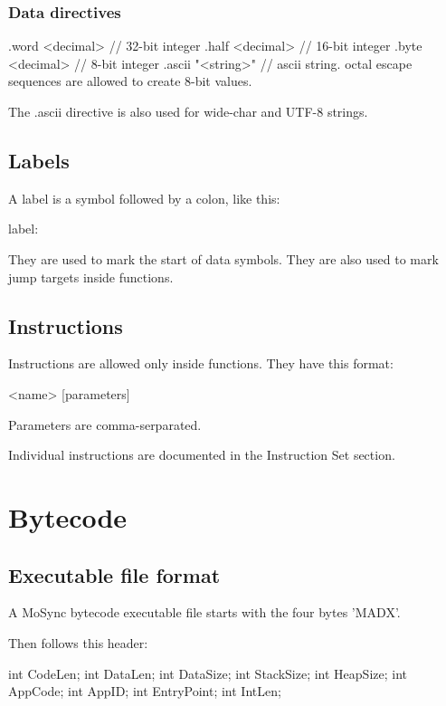 \documentclass {article}
\begin{document}
\subsubsection{Data directives}
\begin{verbatimtab}
.word <decimal>	// 32-bit integer
.half <decimal>	// 16-bit integer
.byte <decimal>	// 8-bit integer
.ascii "<string>"	// ascii string. octal escape sequences are allowed to create 8-bit values.
\end{verbatimtab}

The .ascii directive is also used for wide-char and UTF-8 strings.


\subsection{Labels}

A label is a symbol followed by a colon, like this:

\begin{verbatimtab}
label:
\end{verbatimtab}

They are used to mark the start of data symbols.
They are also used to mark jump targets inside functions.

\subsection{Instructions}

Instructions are allowed only inside functions. They have this format:

\begin{verbatimtab}
<name>	[parameters]
\end{verbatimtab}

Parameters are comma-serparated.

Individual instructions are documented in the Instruction Set section.



\section{Bytecode}

\subsection{Executable file format}

A MoSync bytecode executable file starts with the four bytes 'MADX'.

Then follows this header:
\begin{verbatimtab}
{
	int CodeLen;
	int DataLen;
	int DataSize;
	int StackSize;
	int HeapSize;
	int AppCode;
	int AppID;
	int EntryPoint;
	int IntLen;
}
\end{verbatimtab}
\end{document}
